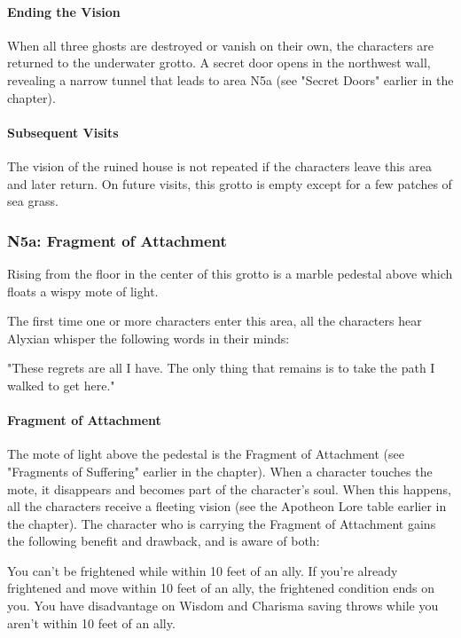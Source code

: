 \documentclass[10pt,a4,twoside,twocolumn,openany,nodeprecatedcode]{dndbook}
\begin{document}
\paragraph{Ending the Vision}
When all three ghosts are destroyed or vanish on their own, the characters are returned to the underwater grotto. A secret door opens in the northwest wall, revealing a narrow tunnel that leads to area N5a (see "Secret Doors" earlier in the chapter).
\paragraph{Subsequent Visits}
The vision of the ruined house is not repeated if the characters leave this area and later return. On future visits, this grotto is empty except for a few patches of sea grass.
\subsubsection{N5a: Fragment of Attachment}
\begin{DndReadAloud}{}
Rising from the floor in the center of this grotto is a marble pedestal above which floats a wispy mote of light.
\end{DndReadAloud}

The first time one or more characters enter this area, all the characters hear Alyxian whisper the following words in their minds:
\begin{DndReadAloud}{}
"These regrets are all I have. The only thing that remains is to take the path I walked to get here."
\end{DndReadAloud}

\paragraph{Fragment of Attachment}
The mote of light above the pedestal is the Fragment of Attachment (see "Fragments of Suffering" earlier in the chapter). When a character touches the mote, it disappears and becomes part of the character's soul. When this happens, all the characters receive a fleeting vision (see the Apotheon Lore table earlier in the chapter).
The character who is carrying the Fragment of Attachment gains the following benefit and drawback, and is aware of both:
\begin{DndComment}{}
{{You can't be frightened while within 10 feet of an ally. If you're already frightened and move within 10 feet of an ally, the frightened condition ends on you.}}
{{You have disadvantage on Wisdom and Charisma saving throws while you aren't within 10 feet of an ally.}}
\end{DndComment}
\end{document}
